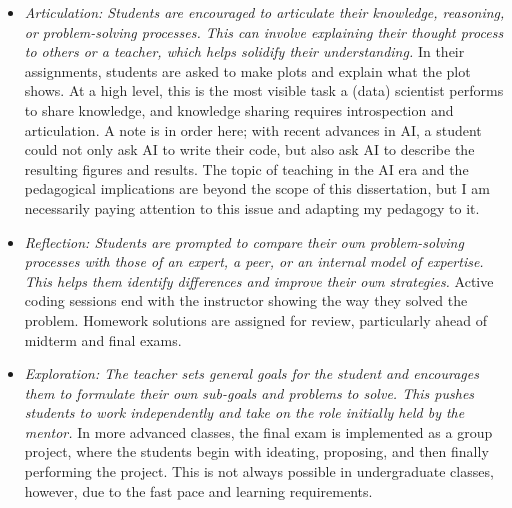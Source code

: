 \vspace{3mm}
\begin{itemize}
    \item\emph{Articulation: Students are encouraged to articulate their knowledge, reasoning, or problem-solving processes. This can involve explaining their thought process to others or a teacher, which helps solidify their understanding.} In their assignments, students are asked to make plots and explain what the plot shows. At a high level, this is the most visible task a (data) scientist performs to share knowledge, and knowledge sharing requires introspection and articulation. A note is in order here; with recent advances in AI, a student could not only ask AI to write their code, but also ask AI to describe the resulting figures and results. The topic of teaching in the AI era and the pedagogical implications \cite{beale_computer_2025,taback_generative_2026} are beyond the scope of this dissertation, but I am necessarily paying attention to this issue and adapting my pedagogy to it.

    \item\emph{Reflection: Students are prompted to compare their own problem-solving processes with those of an expert, a peer, or an internal model of expertise. This helps them identify differences and improve their own strategies.} Active coding sessions end with the instructor showing the way they solved the problem. Homework solutions are assigned for review, particularly ahead of midterm and final exams.
\end{itemize}

\vspace{3mm}
\begin{itemize}
    \item\emph{Exploration: The teacher sets general goals for the student and encourages them to formulate their own sub-goals and problems to solve. This pushes students to work independently and take on the role initially held by the mentor.} In more advanced classes, the final exam is implemented as a group project, where the students begin with ideating, proposing, and then finally performing the project. This is not always possible in undergraduate classes, however, due to the fast pace and learning requirements.
\end{itemize}


